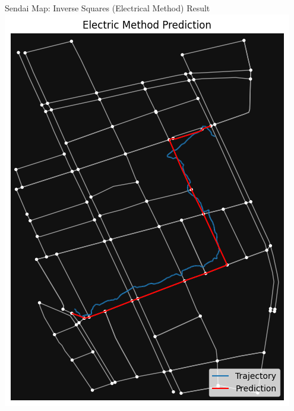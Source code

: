 \documentclass[aspectratio=169, bigfiles]{beamer}
\begin{document}
\begin{frame}{Sendai Map: Inverse Squares (Electrical Method) Result}
\centering
\includegraphics[scale=0.21]{Jupyter Notebook LaTeX/electricsendai.png}
    
\end{frame}
\end{document}
